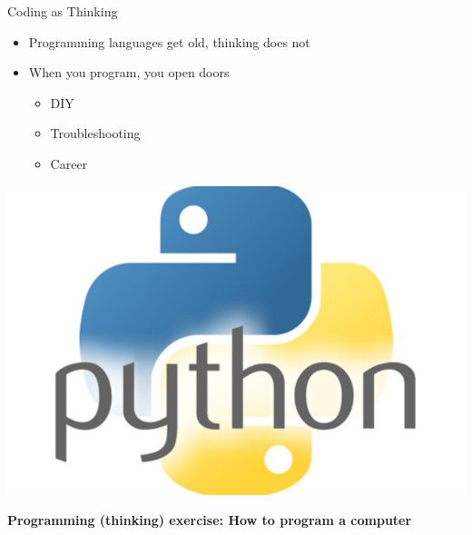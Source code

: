 \documentclass{beamer}
\begin{document}
\begin{frame}{Coding as Thinking}
    \begin{itemize}
        \item Programming languages get old, thinking does not
        \item When you program, you open doors
        \begin{itemize}
          \item DIY
          \item Troubleshooting
          \item Career
        \end{itemize}
    \end{itemize}
\end{frame}

\begin{frame}[plain]
    \includegraphics[width=\textwidth]{img/python-logo.jpg}
\end{frame}


\begin{frame}[plain]
    \begin{center}
      \bf \LARGE Programming (thinking) exercise: How to program a computer
    \end{center}
\end{frame}

    
\end{document}
